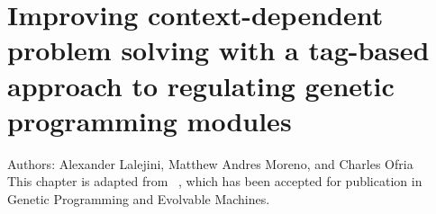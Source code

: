 \chapter{Improving context-dependent problem solving with a tag-based approach to regulating genetic programming modules}
\label{chapter:tag-based-regulation}



\noindent
Authors: Alexander Lalejini, Matthew Andres Moreno, and Charles Ofria \\
This chapter is adapted from ~\citep{lalejini2020tagbased}, which has been accepted for publication in Genetic Programming and Evolvable Machines.







